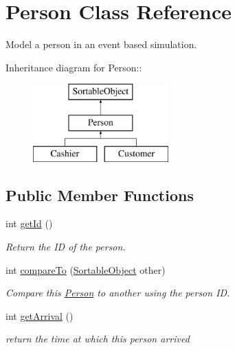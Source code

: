 \hypertarget{class_person}{
\section{Person Class Reference}
\label{class_person}
}
Model a person in an event based simulation.  


Inheritance diagram for Person::\begin{figure}[H]
\begin{center}
\leavevmode
\includegraphics[height=3cm]{class_person}
\end{center}
\end{figure}
\subsection*{Public Member Functions}
\begin{CompactItemize}
\item 
\hypertarget{class_person_fd0359228a09c4adcffe31f456046717}{
int \hyperlink{class_person_fd0359228a09c4adcffe31f456046717}{getId} ()}
\label{class_person_fd0359228a09c4adcffe31f456046717}

\begin{CompactList}\small\item\em Return the ID of the person. \item\end{CompactList}\item 
int \hyperlink{class_person_7cf242bfd4f0bfac0d7baec9dc420c7d}{compareTo} (\hyperlink{class_sortable_object}{SortableObject} other)
\begin{CompactList}\small\item\em Compare this \hyperlink{class_person}{Person} to another using the person ID. \item\end{CompactList}\item 
\hypertarget{class_person_aa828fa4cdfad8cb8d943bf870256081}{
int \hyperlink{class_person_aa828fa4cdfad8cb8d943bf870256081}{getArrival} ()}
\label{class_person_aa828fa4cdfad8cb8d943bf870256081}

\begin{CompactList}\small\item\em return the time at which this person arrived \item\end{CompactList}\end{CompactItemize}
